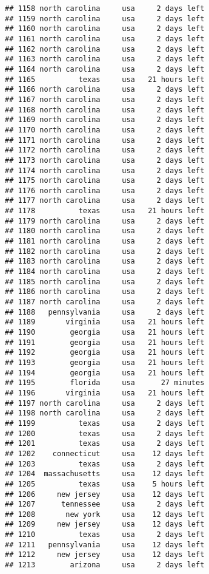 \documentclass[
]{article}
\begin{document}
\begin{verbatim}
## 1158 north carolina     usa     2 days left
## 1159 north carolina     usa     2 days left
## 1160 north carolina     usa     2 days left
## 1161 north carolina     usa     2 days left
## 1162 north carolina     usa     2 days left
## 1163 north carolina     usa     2 days left
## 1164 north carolina     usa     2 days left
## 1165          texas     usa   21 hours left
## 1166 north carolina     usa     2 days left
## 1167 north carolina     usa     2 days left
## 1168 north carolina     usa     2 days left
## 1169 north carolina     usa     2 days left
## 1170 north carolina     usa     2 days left
## 1171 north carolina     usa     2 days left
## 1172 north carolina     usa     2 days left
## 1173 north carolina     usa     2 days left
## 1174 north carolina     usa     2 days left
## 1175 north carolina     usa     2 days left
## 1176 north carolina     usa     2 days left
## 1177 north carolina     usa     2 days left
## 1178          texas     usa   21 hours left
## 1179 north carolina     usa     2 days left
## 1180 north carolina     usa     2 days left
## 1181 north carolina     usa     2 days left
## 1182 north carolina     usa     2 days left
## 1183 north carolina     usa     2 days left
## 1184 north carolina     usa     2 days left
## 1185 north carolina     usa     2 days left
## 1186 north carolina     usa     2 days left
## 1187 north carolina     usa     2 days left
## 1188   pennsylvania     usa     2 days left
## 1189       virginia     usa   21 hours left
## 1190        georgia     usa   21 hours left
## 1191        georgia     usa   21 hours left
## 1192        georgia     usa   21 hours left
## 1193        georgia     usa   21 hours left
## 1194        georgia     usa   21 hours left
## 1195        florida     usa      27 minutes
## 1196       virginia     usa   21 hours left
## 1197 north carolina     usa     2 days left
## 1198 north carolina     usa     2 days left
## 1199          texas     usa     2 days left
## 1200          texas     usa     2 days left
## 1201          texas     usa     2 days left
## 1202    connecticut     usa    12 days left
## 1203          texas     usa     2 days left
## 1204  massachusetts     usa    12 days left
## 1205          texas     usa    5 hours left
## 1206     new jersey     usa    12 days left
## 1207      tennessee     usa     2 days left
## 1208       new york     usa    12 days left
## 1209     new jersey     usa    12 days left
## 1210          texas     usa     2 days left
## 1211   pennsylvania     usa    12 days left
## 1212     new jersey     usa    12 days left
## 1213        arizona     usa     2 days left

\end{verbatim}
\end{document}
